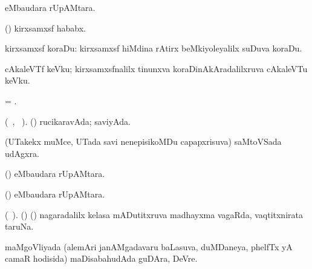 \bentry
{} 
\gl{\gu} 
\bmng
{}  eMbaudara rUpAMtara.
\emng
\eentry

\bentry
{} 
\gl{\nA} 
\bmng
(\pArxparx)  kirxsamxsf hababx.
\emng
\eentry

\bentry
{} 
\gl{\nA} 
\bmng
kirxsamxsf koraDu: 
\banum
{}  kirxsamxsf hiMdina rAtirx beMkiyoleyalilx suDuva koraDu. 

 cAkaleVTf keVku; kirxsamxsfnalilx tinunxva koraDinAkAradalilxruva  cAkaleVTu keVku.
\eanum
\emng 
\eentry

\bentry
{} 
\gl{\nA} 
\bmng
= .
\emng
\eentry

\bentry
{} 
\gl{\gu} 
\bmng
(\tara\ , \tama\ ).
(\AmA) rucikaravAda; saviyAda.
\emng
\eentry

\bentry
{} 
\gl{\BAavayx} 
\bmng
(UTakekx muMce, UTada  savi nenepisikoMDu capapxrisuva) saMtoVSada udAgxra.
\emng
\eentry

\bentry
{} 
\gl{\kirxvi} 
\bmng
(\ame)  eMbaudara rUpAMtara.
\emng
\eentry

\bentry
{} 
\gl{\nA}
\bmng
(\ame)  eMbaudara rUpAMtara.
\emng
\eentry

\bentry
{} 
\gl{\nA} 
\bmng
(\bava\ ). 
(\AmA) (\hiV) nagaradalilx kelasa mADutitxruva madhayxma vagaRda, vaqtitxnirata taruNa.
\emng
\eentry

\bentry
{} 
\gl{\nA} 
\bmng
maMgoVliyada (alemAri janAMgadavaru baLasuva, duMDaneya, phelfTx yA camaR hodisida) maDisabahudAda guDAra, DeVre.
\emng 
\eentry

\bentry
{}
\gl{\saMkiSx} 
\bmng
{}
\emng
\eentry


%


